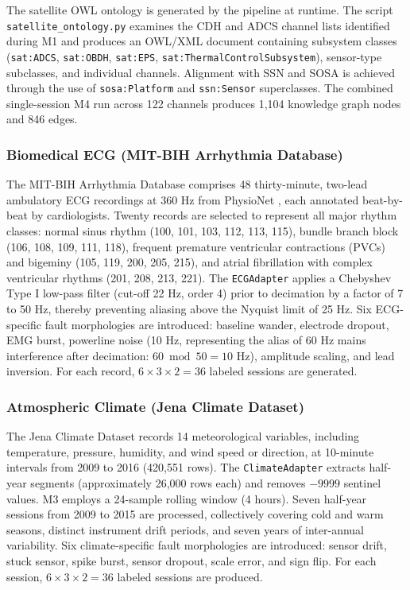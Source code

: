 \documentclass[conference]{IEEEtran}
\begin{document}
The satellite OWL ontology is generated by the pipeline at runtime. The script \texttt{satellite\_ontology.py} examines the CDH and ADCS channel lists identified during M1 and produces an OWL/XML document containing subsystem classes (\texttt{sat:ADCS}, \texttt{sat:OBDH}, \texttt{sat:EPS}, \texttt{sat:ThermalControlSubsystem}), sensor-type subclasses, and individual channels. Alignment with SSN and SOSA is achieved through the use of \texttt{sosa:Platform} and \texttt{ssn:Sensor} superclasses. The combined single-session M4 run across 122 channels produces 1,104 knowledge graph nodes and 846 edges.

\subsubsection{Biomedical ECG (MIT-BIH Arrhythmia Database)}

The MIT-BIH Arrhythmia Database \cite{moody2001mitbih} comprises 48 thirty-minute, two-lead ambulatory ECG recordings at 360 Hz from PhysioNet \cite{goldberger2000physiobank}, each annotated beat-by-beat by cardiologists. Twenty records are selected to represent all major rhythm classes: normal sinus rhythm (100, 101, 103, 112, 113, 115), bundle branch block (106, 108, 109, 111, 118), frequent premature ventricular contractions (PVCs) and bigeminy (105, 119, 200, 205, 215), and atrial fibrillation with complex ventricular rhythms (201, 208, 213, 221). The \texttt{ECGAdapter} applies a Chebyshev Type I low-pass filter (cut-off 22 Hz, order 4) prior to decimation by a factor of 7 to 50 Hz, thereby preventing aliasing above the Nyquist limit of 25 Hz. Six ECG-specific fault morphologies are introduced: baseline wander, electrode dropout, EMG burst, powerline noise (10 Hz, representing the alias of 60 Hz mains interference after decimation: $60 \bmod 50 = 10$ Hz), amplitude scaling, and lead inversion. For each record, $6 \times 3 \times 2 = 36$ labeled sessions are generated.

\subsubsection{Atmospheric Climate (Jena Climate Dataset)}

The Jena Climate Dataset \cite{jena_climate} records 14 meteorological variables, including temperature, pressure, humidity, and wind speed or direction, at 10-minute intervals from 2009 to 2016 (420,551 rows). The \texttt{ClimateAdapter} extracts half-year segments (approximately 26,000 rows each) and removes $-9999$ sentinel values. M3 employs a 24-sample rolling window (4 hours). Seven half-year sessions from 2009 to 2015 are processed, collectively covering cold and warm seasons, distinct instrument drift periods, and seven years of inter-annual variability. Six climate-specific fault morphologies are introduced: sensor drift, stuck sensor, spike burst, sensor dropout, scale error, and sign flip. For each session, $6 \times 3 \times 2 = 36$ labeled sessions are produced.
\end{document}
